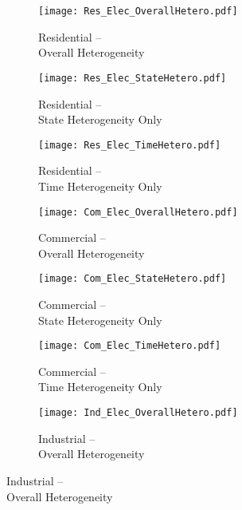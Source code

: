 \documentclass[11pt]{article}
\begin{document}
	\begin{figure}
	\centering
	
	\begin{subfigure}{0.325\textwidth}
		\centering
		\caption{Residential -- \\ Overall Heterogeneity}
		\label{fig:res_hetero_overall}
		\texttt{[image: Res\_Elec\_OverallHetero.pdf]}
	\end{subfigure} \hspace{0em}%
	\begin{subfigure}{0.325\textwidth}
		\centering
		\caption{Residential -- \\ State Heterogeneity Only}
		\label{fig:res_hetero_state}
		\texttt{[image: Res\_Elec\_StateHetero.pdf]}
	\end{subfigure} \hspace{0em}%
	\begin{subfigure}{0.325\textwidth}
		\centering
		\caption{Residential -- \\ Time Heterogeneity Only}
		\label{fig:res_hetero_time}
		\texttt{[image: Res\_Elec\_TimeHetero.pdf]}
	\end{subfigure}
	\begin{subfigure}{0.325\textwidth}
	\centering
	\caption{Commercial -- \\ Overall Heterogeneity}
	\label{fig:com_hetero_overall}
	\texttt{[image: Com\_Elec\_OverallHetero.pdf]}
	\end{subfigure} \hspace{0em}%
	\begin{subfigure}{0.325\textwidth}
	\centering
	\caption{Commercial -- \\ State Heterogeneity Only}
	\label{fig:com_hetero_state}
	\texttt{[image: Com\_Elec\_StateHetero.pdf]}
	\end{subfigure} \hspace{0em}%
		\begin{subfigure}{0.325\textwidth}
	\centering
	\caption{Commercial -- \\ Time Heterogeneity Only}
	\label{fig:com_hetero_time}
	\texttt{[image: Com\_Elec\_TimeHetero.pdf]}
	\end{subfigure}
	\begin{subfigure}{0.325\textwidth}
	\centering
	\caption{Industrial -- \\ Overall Heterogeneity}
	\label{fig:ind_hetero_overall}
	\texttt{[image: Ind\_Elec\_OverallHetero.pdf]}
	\end{subfigure} \hspace{0em}%

\end{figure}
\end{document}

